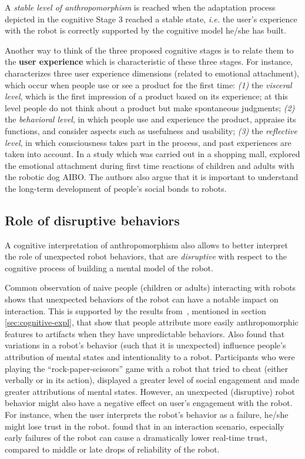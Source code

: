 \documentclass{frontiersSCNS} %
\newcommand{\ie}{\textit{i.e.}\xspace}
\begin{document}
A \emph{stable level of anthropomorphism} is reached when the adaptation process
depicted in the cognitive Stage 3 reached a stable state, \ie the user's
experience with the robot is correctly supported by the cognitive model he/she
has built.

Another way to think of the three proposed cognitive stages is to relate them to
the \textbf{user experience} which is characteristic of these three stages. For
instance, \cite{norman_emotional_2003} characterizes  three user experience
dimensions (related to emotional attachment), which occur when people use or see
a product for the first time: \emph{(1)} the \emph{visceral level}, which is the
first impression of a product based on its experience; at this level people do
not think about a product but make spontaneous judgments; \emph{(2)} the
\emph{behavioral level}, in which people use and experience the product,
appraise its functions, and consider aspects such as usefulness and usability;
\emph{(3)} the \emph{reflective level}, in which consciousness takes part in the
process, and past experiences are taken into account.  In a study which was
carried out in a shopping mall, \cite{weiss_i_2009} explored the emotional
attachment during first time reactions of children and adults with the robotic
dog AIBO. The authors also argue that it is important to understand the
long-term development of people's social bonds to robots.


\subsection{Role of disruptive behaviors}
\label{sec:disruptive}

A cognitive interpretation of anthropomorphism also allows to better interpret
the role of unexpected robot behaviors, that are \emph{disruptive} with respect
to the cognitive process of building a mental model of the robot.

Common observation of naive people (children or adults) interacting with robots
shows that unexpected behaviors of the robot can have a notable impact on
interaction. This is supported by the results from~\citet{Waytz2010}, mentioned
in section \ref{sec:cognitive-expl}, that show that people attribute more easily
anthropomorphic features to artifacts when they have unpredictable behaviors.
Also \cite{short_no_2010} found that variations in a robot's behavior (such that
it is unexpected) influence people's attribution of mental states and
intentionality to a robot. Participants who were playing the
``rock-paper-scissors'' game with a robot that tried to cheat (either verbally
or in its action), displayed a greater level of social engagement and made
greater attributions of mental states.  However, an unexpected (disruptive)
robot behavior might also have a negative effect on user's engagement with the
robot. For instance, when the user interprets the robot's behavior as a failure,
he/she might lose trust in the robot. \cite{desai_impact_2013} found that in an
interaction scenario, especially early failures of the robot can cause a
dramatically lower real-time trust, compared to middle or late drops of
reliability of the robot.
\end{document}
